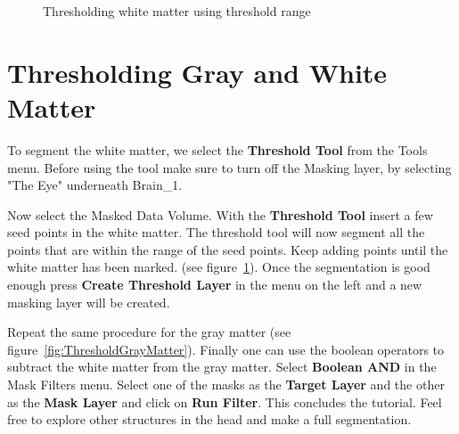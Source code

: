 \documentclass[fleqn,11pt,openany]{book}
\begin{document}
\begin{figure}
\caption{Thresholding white matter using threshold range}\label{fig:ThresholdWhiteMatter}
\end{figure}

\section{Thresholding Gray and White Matter}

To segment the white matter, we select the {\bf Threshold Tool} from the Tools menu. Before using the tool make sure to turn off the Masking layer, by selecting  "The Eye" underneath Brain\_1. 

Now select the Masked Data Volume. With the {\bf Threshold Tool} insert a few seed points in the white matter. The threshold tool will now segment all the points that are within the range of the seed points. Keep adding points until the white matter has been marked.
(see figure~\ref{fig:ThresholdWhiteMatter}). Once the segmentation is good enough press {\bf Create Threshold Layer} in the menu on the left and a new masking layer will be created.

Repeat the same procedure for the gray matter (see figure~\ref{fig:ThresholdGrayMatter}). Finally one can use the boolean operators to subtract the white matter from the gray matter. Select {\bf Boolean AND} in the Mask Filters menu. Select one of the masks as the {\bf Target Layer} and the other as the {\bf Mask Layer} and click on {\bf Run Filter}. This concludes the tutorial. Feel free to explore other structures in the head and make a full segmentation.
\end{document}
